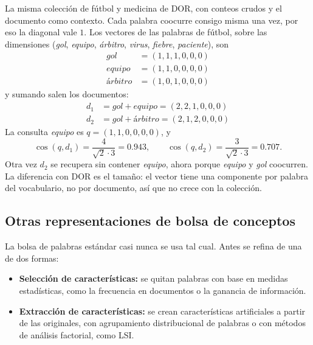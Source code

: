 \documentclass[11pt,letterpaper]{article}
\begin{document}
\begin{ejemplo}
    La misma colección de fútbol y medicina de DOR, con conteos crudos
    y el documento como contexto. Cada palabra coocurre consigo misma
    una vez, por eso la diagonal vale $1$. Los vectores de las palabras
    de fútbol, sobre las dimensiones (\textit{gol}, \textit{equipo},
    \textit{árbitro}, \textit{virus}, \textit{fiebre},
    \textit{paciente}), son
    \begin{align*}
        \textit{gol}     &= (1,1,1,0,0,0) \\
        \textit{equipo}  &= (1,1,0,0,0,0) \\
        \textit{árbitro} &= (1,0,1,0,0,0)
    \end{align*}
    y sumando salen los documentos:
    \begin{align*}
        d_1 &= \textit{gol} + \textit{equipo}  = (2,2,1,0,0,0) \\
        d_2 &= \textit{gol} + \textit{árbitro} = (2,1,2,0,0,0)
    \end{align*}
    La consulta \textit{equipo} es $q = (1,1,0,0,0,0)$, y
    \[
        \cos(q, d_1) = \frac{4}{\sqrt{2}\cdot 3} = 0.943 ,
        \qquad
        \cos(q, d_2) = \frac{3}{\sqrt{2}\cdot 3} = 0.707 .
    \]
    Otra vez $d_2$ se recupera sin contener \textit{equipo}, ahora
    porque \textit{equipo} y \textit{gol} coocurren. La diferencia con
    DOR es el tamaño: el vector tiene una componente por palabra del
    vocabulario, no por documento, así que no crece con la colección.
\end{ejemplo}

\subsection*{Otras representaciones de bolsa de conceptos}

La bolsa de palabras estándar casi nunca se usa tal cual. Antes se
refina de una de dos formas:

\begin{itemize}[itemsep=0.3em]
    \item \textbf{Selección de características:} se quitan palabras
          con base en medidas estadísticas, como la frecuencia en
          documentos o la ganancia de información.
    \item \textbf{Extracción de características:} se crean
          características artificiales a partir de las originales,
          con agrupamiento distribucional de palabras o con métodos de
          análisis factorial, como LSI.
\end{itemize}
\end{document}
